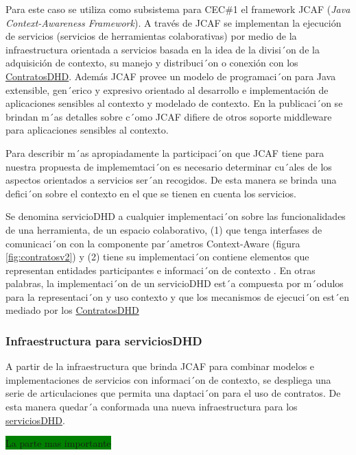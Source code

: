 {Para este caso se utiliza como subsistema para CEC\#1 el framework JCAF 
(\textit{Java Context-Awareness Framework}). A través de JCAF se implementan
la ejecución de servicios (servicios de herramientas colaborativas) por medio de
la infraestructura orientada a servicios basada en la idea de la divisi´on de la
adquisición de contexto, su manejo y  distribuci´on o conexión con los
\hyperref[contratosDHD]{ContratosDHD}. Además JCAF provee un modelo de
programaci´on para Java extensible, gen´erico y expresivo orientado al
desarrollo e implementación de aplicaciones sensibles al contexto y modelado de contexto. En la  publicaci´on \cite{JCAF} se brindan m´as detalles sobre c´omo JCAF difiere de otros soporte middleware para aplicaciones sensibles al contexto. 


Para describir m´as apropiadamente la participaci´on que JCAF tiene para 
nuestra propuesta de implememtaci´on es necesario determinar cu´ales de los aspectos orientados a servicios ser´an recogidos. De esta manera se brinda una defici´on sobre el contexto en el que se tienen en cuenta los servicios.


\begin{defi}[ServiciosDHD:] \label{serviciosDHD}
Se denomina servicioDHD a cualquier implementaci´on sobre las funcionalidades
de una herramienta, de un espacio colaborativo, (1) que tenga interfases de
comunicaci´on con la componente par´ametros Context-Aware (figura
\ref{fig:contratosv2}) y  (2) tiene su implementaci´on contiene elementos que
representan entidades participantes e informaci´on de contexto \cite{Dey}. En
otras palabras, la implementaci´on de un servicioDHD est´a compuesta por
m´odulos para la representaci´on y uso contexto y que los mecanismos de
ejecuci´on est´en mediado por los \hyperref[contratosdhd]{ContratosDHD} 

\end{defi}


\subsubsection{Infraestructura para serviciosDHD}


A partir de la infraestructura que brinda JCAF para combinar modelos e implementaciones de servicios con informaci´on de contexto, se despliega una serie de articulaciones que permita una daptaci´on para el uso de contratos. De esta manera quedar´a conformada una nueva infraestructura para los \hyperref[serviciosDHD]{serviciosDHD}.  

\colorbox{green}{La parte mas importante}

}
